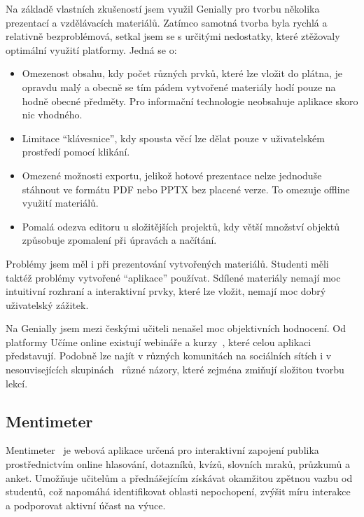 Na základě vlastních zkušeností jsem využil Genially pro tvorbu několika prezentací a vzdělávacích materiálů. 
Zatímco samotná tvorba byla rychlá a relativně bezproblémová, setkal jsem se s určitými nedostatky, které ztěžovaly optimální využití platformy. 
Jedná se o:

\begin{itemize}
    \item Omezenost obsahu, kdy počet různých prvků, které lze vložit do plátna, je opravdu malý a obecně se tím pádem vytvořené materiály hodí pouze na hodně obecné předměty. Pro informační technologie neobsahuje aplikace skoro nic vhodného.  
    \item Limitace \enquote{klávesnice}, kdy spousta věcí lze dělat pouze v uživatelském prostředí pomocí klikání. 
    \item Omezené možnosti exportu, jelikož hotové prezentace nelze jednoduše stáhnout ve formátu PDF nebo PPTX bez placené verze. To omezuje offline využití materiálů.  
    \item Pomalá odezva editoru u složitějších projektů, kdy větší množství objektů způsobuje zpomalení při úpravách a načítání.  
\end{itemize}

Problémy jsem měl i při prezentování vytvořených materiálů. 
Studenti měli taktéž problémy vytvořené \enquote{aplikace} používat. 
Sdílené materiály nemají moc intuitivní rozhraní a interaktivní prvky, které lze vložit, nemají moc dobrý uživatelský zážitek.

Na Genially jsem mezi českými učiteli nenašel moc objektivních hodnocení.
Od platformy Učíme online existují webináře a kurzy~\cite{genially_ucimeonline}, které celou aplikaci představují.
Podobně lze najít v různých komunitách na sociálních sítích i v nesouvisejících skupinách~\cite{canva_facebook} různé názory, které zejména zmiňují složitou tvorbu lekcí.

\subsection{Mentimeter}

Mentimeter~\cite{mentimeter} je webová aplikace určená pro interaktivní zapojení publika prostřednictvím online hlasování, dotazníků, kvízů, slovních mraků, průzkumů a anket. 
Umožňuje učitelům a přednášejícím získávat okamžitou zpětnou vazbu od studentů, což napomáhá identifikovat oblasti nepochopení, zvýšit míru interakce a podporovat aktivní účast na výuce. 

